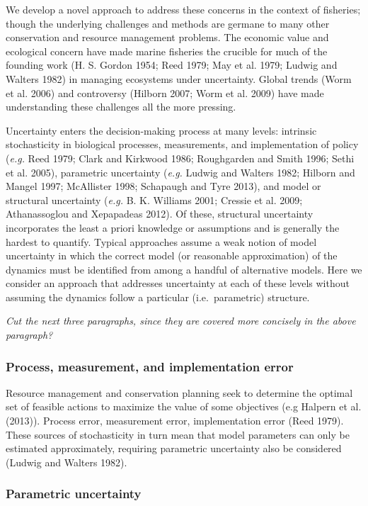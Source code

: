 \documentclass[author-year, review]{elsarticle} %
\begin{document}
We develop a novel approach to address these concerns in the context of
fisheries; though the underlying challenges and methods are germane to
many other conservation and resource management problems. The economic
value and ecological concern have made marine fisheries the crucible for
much of the founding work (H. S. Gordon 1954; Reed 1979; May et al.
1979; Ludwig and Walters 1982) in managing ecosystems under uncertainty.
Global trends (Worm et al. 2006) and controversy (Hilborn 2007; Worm et
al. 2009) have made understanding these challenges all the more
pressing.

Uncertainty enters the decision-making process at many levels: intrinsic
stochasticity in biological processes, measurements, and implementation
of policy (\emph{e.g.} Reed 1979; Clark and Kirkwood 1986; Roughgarden
and Smith 1996; Sethi et al. 2005), parametric uncertainty (\emph{e.g.}
Ludwig and Walters 1982; Hilborn and Mangel 1997; McAllister 1998;
Schapaugh and Tyre 2013), and model or structural uncertainty
(\emph{e.g.} B. K. Williams 2001; Cressie et al. 2009; Athanassoglou and
Xepapadeas 2012). Of these, structural uncertainty incorporates the
least a priori knowledge or assumptions and is generally the hardest to
quantify. Typical approaches assume a weak notion of model uncertainty
in which the correct model (or reasonable approximation) of the dynamics
must be identified from among a handful of alternative models. Here we
consider an approach that addresses uncertainty at each of these levels
without assuming the dynamics follow a particular (i.e.~parametric)
structure.

\emph{Cut the next three paragraphs, since they are covered more
concisely in the above paragraph?}

\subsubsection{Process, measurement, and implementation
error}\label{process-measurement-and-implementation-error}

Resource management and conservation planning seek to determine the
optimal set of feasible actions to maximize the value of some objectives
(e.g Halpern et al. (2013)). Process error, measurement error,
implementation error (Reed 1979). These sources of stochasticity in turn
mean that model parameters can only be estimated approximately,
requiring parametric uncertainty also be considered (Ludwig and Walters
1982).

\subsubsection{Parametric uncertainty}\label{parametric-uncertainty}
\end{document}
